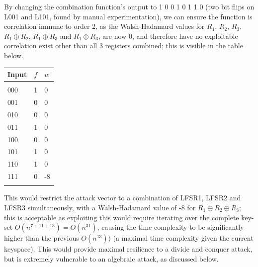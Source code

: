 \documentclass[british,10pt,a4paper]{article}
\begin{document}
By changing the combination function's output to 1 0 0 1 0 1 1 0 (two bit flips on L001 and L101, found by manual experimentation), we can ensure the function
is correlation immune to order 2, as the Walsh-Hadamard values for \(R_1\),
\(R_2\),  \(R_3\),  \(R_1 \oplus R_2\), \(R_1 \oplus R_3\) and \(R_1 \oplus R_3\), are now 0,
and therefore have no exploitable correlation exist other than all 3 registers combined; this is visible in the table below.

\begin{center}
	\begin{tabular}{@{}lll@{}}\label{tab:walsh2} \\
		Input & \(f\) & \(w\) \\
		\midrule \\
		000   & 1     & 0     \\
		001   & 0     & 0     \\
		010   & 0     & 0     \\
		011   & 1     & 0     \\
		100   & 0     & 0     \\
		101   & 1     & 0     \\
		110   & 1     & 0     \\
		111   & 0     & -8    \\
		\bottomrule \\
	\end{tabular}
\end{center}
This would restrict the attack vector to a combination of LFSR1, LFSR2 and LFSR3 simultaneously, with a Walsh-Hadamard value of -8 for \(R_1 \oplus R_2 \oplus R_3\); this is acceptable as exploiting this would require iterating over the complete key-set \(O(n^{7+11+13}) = O(n^{31})\), causing the time complexity to be significantly higher than the previous \(O(n^{13}))\) (a maximal time complexity given the current keyspace). This would provide maximal resilience to a divide and conquer attack, but is extremely vulnerable to an algebraic attack, as discussed below.
\end{document}
